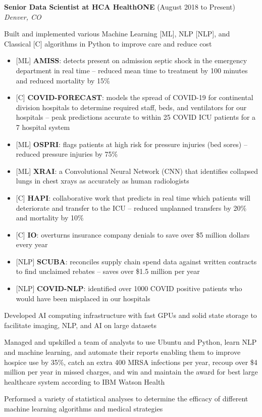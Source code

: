 \begin{resume}
    {\bf Senior Data Scientist at HCA HealthONE} (August 2018 to Present)\\\vspace{2mm}%
    \textit{Denver, CO}
    \begin{stuff}
        \vspace*{1mm}
            \item Built and implemented various Machine Learning {[ML]}, NLP {[NLP]}, and Classical {[C]} algorithms in Python to improve care and reduce cost
            \begin{itemize}
                \item {[ML]} {\bf AMISS}: detects present on admission septic shock in the emergency department in real time -- reduced mean time to treatment by 100 minutes and reduced mortality by 15\%
                \item {[C]} {\bf COVID-FORECAST}: models the spread of COVID-19 for continental division hospitals to determine required staff, beds, and ventilators for our hospitals – peak predictions accurate to within 25 COVID ICU patients for a 7 hospital system  
                \item {[ML]} {\bf OSPRI}: flags patients at high risk for pressure injuries (bed sores) -- reduced pressure injuries by 75\%
                \item {[ML]} {\bf XRAI}: a Convolutional Neural Network (CNN) that identifies collapsed lungs in chest xrays as accurately as human radiologists
                \item {[C]} {\bf HAPI}: collaborative work that predicts in real time which patients will deteriorate and transfer to the ICU – reduced unplanned transfers by 20\% and mortality by 10\%
                \item {[C]} {\bf IO}: overturns insurance company denials to save over \$5 million dollars every year
                \item {[NLP]} {\bf SCUBA}: reconciles supply chain spend data against written contracts to find unclaimed rebates -- saves over \$1.5 million per year
                \item {[NLP]} {\bf COVID-NLP}: identified over 1000 COVID positive patients who would have been misplaced in our hospitals 
             \end{itemize} 
            \item Developed AI computing infrastructure with fast GPUs and solid state storage to facilitate imaging, NLP, and AI on large datasets
            \item Managed and upskilled a team of analysts to use Ubuntu and Python, learn NLP and machine learning, and automate their reports enabling them to improve hospice use by 35\%, catch an extra 400 MRSA infections per year, recoup over \$4 million per year in missed charges, and win and maintain the award for best large healthcare system according to IBM Watson Health
            \item Performed a variety of statistical analyses to determine the efficacy of different machine learning algorithms and medical strategies
    \end{stuff}


\end{resume}
